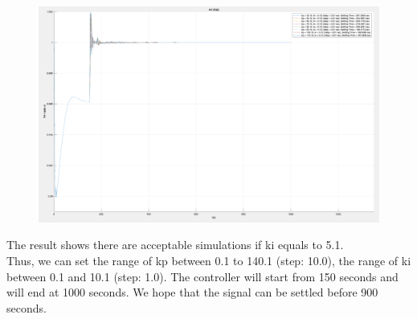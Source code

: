 \begin{figure}[htbp]
\centering
\includegraphics[width = .819\textwidth]{figure/4_1_2_c.png}
\end{figure}

The result shows there are acceptable simulations if ki equals to 5.1. \\

Thus, we can set the range of kp between 0.1 to 140.1 (step: 10.0), the range of ki between 0.1 and 10.1 (step: 1.0). The controller will start from 150 seconds and will end at 1000 seconds. We hope that the signal can be settled before 900 seconds.